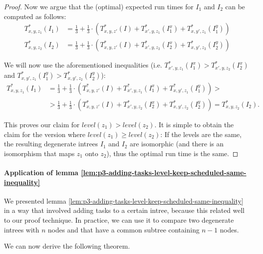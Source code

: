 \begin{proof}
  Now we argue that the (optimal) expected run times for $I_1$ and $I_2$ can be computed as follows:
  \begin{align*}
    T^*_{x,y,z_1}(I_1) & = 
      \frac{1}{3} + 
      \frac{1}{3}\cdot \left( 
        T_{x,y,z'}^*(I) + 
        T^*_{x',y,z_1}(I^x_{1}) +
        T^*_{x,y',z_1}(I^y_{1}) 
      \right)
      \\
    T^*_{x,y,z_2}(I_2) & = 
      \frac{1}{3} + 
      \frac{1}{3}\cdot \left( 
        T_{x,y,z'}^*(I) + 
        T^*_{x',y,z_2}(I^x_{2}) +
        T^*_{x,y',z_2}(I^y_{2}) 
      \right)
  \end{align*}

  We will now use the aforementioned inequalities (i.e. $T^*_{x',y,z_1}(I^x_{1}) > T^*_{x',y,z_2}(I^x_{2})$ and $T^*_{x,y',z_1}(I^y_{1}) > T^*_{x,y',z_2}(I^y_{2})$):
\begin{align*}
    T^*_{x,y,z_1}(I_1) & = 
      \frac{1}{3} + 
      \frac{1}{3}\cdot \left( 
        T_{x,y,z'}^*(I) + 
        T^*_{x',y,z_1}(I^x_{1}) +
        T^*_{x,y',z_1}(I^y_{1}) 
      \right)
      > 
      \\
      & >
      \frac{1}{3} + 
      \frac{1}{3}\cdot \left( 
        T_{x,y,z'}^*(I) + 
        T^*_{x',y,z_2}(I^x_{2}) +
        T^*_{x,y',z_2}(I^y_{2}) 
      \right) 
      = T^*_{x,y,z_2}(I_2).
  \end{align*}

  This proves our claim for $level(z_1) > level(z_2)$. It is simple to obtain the claim for the version where $level(z_1) \geq level(z_2)$: If the levels are the same, the resulting degenerate intrees $I_1$ and $I_2$ are isomorphic (and there is an isomorphism that maps $z_1$ onto $z_2$), thus the optimal run time is the same. 
\end{proof}

\paragraph{Application of lemma \ref{lem:p3-adding-tasks-level-keep-scheduled-same-inequality}}

We presented lemma \ref{lem:p3-adding-tasks-level-keep-scheduled-same-inequality} in a way that involved adding tasks to a certain intree, because this related well to our proof technique. In practice, we can use it to compare two degenerate intrees with $n$ nodes and that have a common subtree containing $n-1$ nodes.

We can now derive the following theorem.


